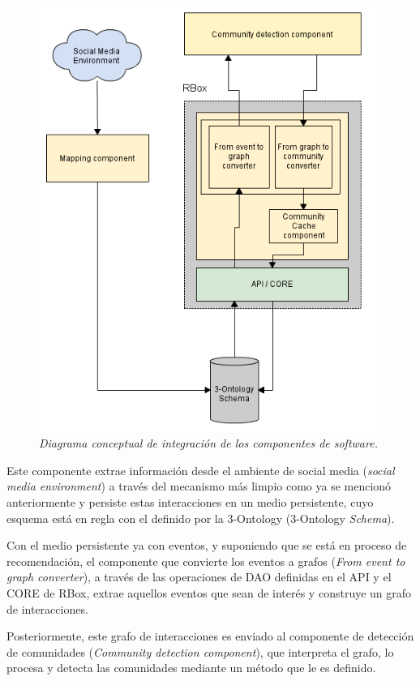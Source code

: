 \begin{figure}
  \centering
  \includegraphics[scale=.5]{images/Figura7-4}
  \caption{\em Diagrama conceptual de integración de los componentes de \textit{software}.}
  \label{fig:vis-im4}
\end{figure}

Este componente extrae información desde el ambiente de social media (\textit{social media environment}) a través del mecanismo más limpio como ya se mencionó anteriormente y persiste estas interacciones en un medio persistente, cuyo esquema está en regla con el definido por la 3-Ontology (3-Ontology \textit{Schema}).

Con el medio persistente ya con eventos, y suponiendo que se está en proceso de recomendación, el componente que convierte los eventos a grafos (\textit{From event to graph converter}), a través de las operaciones de DAO definidas en el API y el CORE de RBox, extrae aquellos eventos que sean de interés y construye un grafo de interacciones.

Posteriormente, este grafo de interacciones es enviado al componente de detección de comunidades (\textit{Community detection component}), que interpreta el grafo, lo procesa y detecta las comunidades mediante un método que le es definido.

